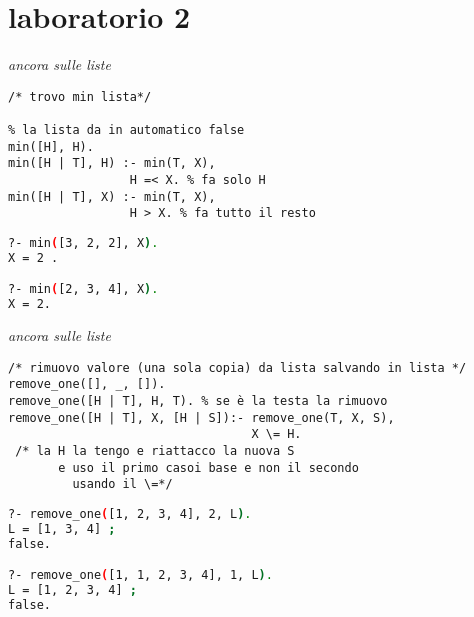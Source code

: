 \documentclass[a4paper,12pt, oneside]{book}
\begin{document}
\section{laboratorio 2}
\begin{esercizio}
\textit{ancora sulle liste}
\begin{verbatim}
/* trovo min lista*/

% la lista da in automatico false
min([H], H).
min([H | T], H) :- min(T, X),
                 H =< X. % fa solo H
min([H | T], X) :- min(T, X),
                 H > X. % fa tutto il resto

\end{verbatim}
\begin{shaded}
\begin{lstlisting}[language=bash]
?- min([3, 2, 2], X).
X = 2 .

?- min([2, 3, 4], X).
X = 2.
\end{lstlisting}
\end{shaded}
\end{esercizio}
\begin{esercizio}
\textit{ancora sulle liste}
\begin{verbatim}
/* rimuovo valore (una sola copia) da lista salvando in lista */
remove_one([], _, []).
remove_one([H | T], H, T). % se è la testa la rimuovo
remove_one([H | T], X, [H | S]):- remove_one(T, X, S),
                                  X \= H.
 /* la H la tengo e riattacco la nuova S
       e uso il primo casoi base e non il secondo
         usando il \=*/
\end{verbatim}
\begin{shaded}
\begin{lstlisting}[language=bash]
?- remove_one([1, 2, 3, 4], 2, L).
L = [1, 3, 4] ;
false.

?- remove_one([1, 1, 2, 3, 4], 1, L).
L = [1, 2, 3, 4] ;
false.
\end{lstlisting}
\end{shaded}
\end{esercizio}
\end{document}
